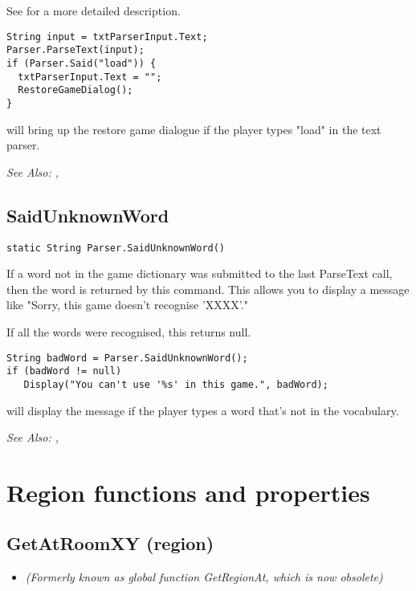 See  for a more detailed description.


\begin{verbatim}
String input = txtParserInput.Text;
Parser.ParseText(input);
if (Parser.Said("load")) {
  txtParserInput.Text = "";
  RestoreGameDialog();
}
\end{verbatim}
will bring up the restore game dialogue if the player types "load" in the text parser.

\it{See Also:} , 


\subsection{SaidUnknownWord}\label{Parser.SaidUnknownWord}%

\begin{verbatim}
static String Parser.SaidUnknownWord()
\end{verbatim}
If a word not in the game dictionary was submitted to the last ParseText
call, then the word is returned by this command. This allows you to display a
message like "Sorry, this game doesn't recognise 'XXXX'."

If all the words were recognised, this returns null.

\begin{verbatim}
String badWord = Parser.SaidUnknownWord();
if (badWord != null)
   Display("You can't use '%s' in this game.", badWord);
\end{verbatim}
will display the message if the player types a word that's not in the vocabulary.

\it{See Also:} , 


\section{Region functions and properties}%


\subsection{GetAtRoomXY (region)}\label{Region.GetAtRoomXY}%

\begin{itemize}
\item \it{(Formerly known as global function GetRegionAt, which is now obsolete)}
\end{itemize}

